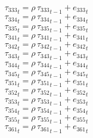 \begin{dmath}
{{\tau_{333}}}_{t}={{\rho}}\, {{\tau_{333}}}_{t-1}+{{e_{333}}}_{t}
\end{dmath}
\begin{dmath}
{{\tau_{334}}}_{t}={{\rho}}\, {{\tau_{334}}}_{t-1}+{{e_{334}}}_{t}
\end{dmath}
\begin{dmath}
{{\tau_{335}}}_{t}={{\rho}}\, {{\tau_{335}}}_{t-1}+{{e_{335}}}_{t}
\end{dmath}
\begin{dmath}
{{\tau_{341}}}_{t}={{\rho}}\, {{\tau_{341}}}_{t-1}+{{e_{341}}}_{t}
\end{dmath}
\begin{dmath}
{{\tau_{342}}}_{t}={{\rho}}\, {{\tau_{342}}}_{t-1}+{{e_{342}}}_{t}
\end{dmath}
\begin{dmath}
{{\tau_{343}}}_{t}={{\rho}}\, {{\tau_{343}}}_{t-1}+{{e_{343}}}_{t}
\end{dmath}
\begin{dmath}
{{\tau_{344}}}_{t}={{\rho}}\, {{\tau_{344}}}_{t-1}+{{e_{344}}}_{t}
\end{dmath}
\begin{dmath}
{{\tau_{345}}}_{t}={{\rho}}\, {{\tau_{345}}}_{t-1}+{{e_{345}}}_{t}
\end{dmath}
\begin{dmath}
{{\tau_{351}}}_{t}={{\rho}}\, {{\tau_{351}}}_{t-1}+{{e_{351}}}_{t}
\end{dmath}
\begin{dmath}
{{\tau_{352}}}_{t}={{\rho}}\, {{\tau_{352}}}_{t-1}+{{e_{352}}}_{t}
\end{dmath}
\begin{dmath}
{{\tau_{353}}}_{t}={{\rho}}\, {{\tau_{353}}}_{t-1}+{{e_{353}}}_{t}
\end{dmath}
\begin{dmath}
{{\tau_{354}}}_{t}={{\rho}}\, {{\tau_{354}}}_{t-1}+{{e_{354}}}_{t}
\end{dmath}
\begin{dmath}
{{\tau_{355}}}_{t}={{\rho}}\, {{\tau_{355}}}_{t-1}+{{e_{355}}}_{t}
\end{dmath}
\begin{dmath}
{{\tau_{361}}}_{t}={{\rho}}\, {{\tau_{361}}}_{t-1}+{{e_{361}}}_{t}
\end{dmath}
